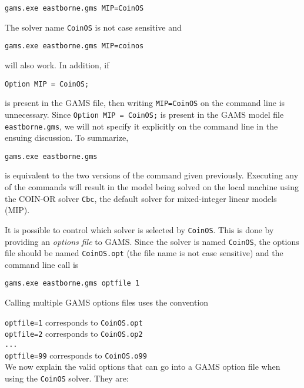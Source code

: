 \begin{verbatim}
gams.exe eastborne.gms MIP=CoinOS
\end{verbatim}
The solver name {\tt CoinOS} is not case sensitive and 
\begin{verbatim}
gams.exe eastborne.gms MIP=coinos
\end{verbatim}
will also work.  In addition, if
\begin{verbatim}
Option MIP = CoinOS;
\end{verbatim}
is present in the GAMS file, then writing {\tt MIP=CoinOS} on the command line is unnecessary.
Since {\tt Option MIP = CoinOS;} is present in the GAMS model file {\tt eastborne.gms}, 
we will not specify it explicitly on the command line in the ensuing discussion. To summarize,
\begin{verbatim}
gams.exe eastborne.gms 
\end{verbatim}
is equivalent to the two versions of the command given previously.  Executing any of the commands will 
result in the model being solved on the local machine using the COIN-OR solver {\tt Cbc}, the default solver 
for 
mixed-integer linear models (MIP).

It is possible to control which solver is selected by {\tt CoinOS}.    This is done by providing an {\it options file}  to  GAMS.   
Since the solver is named {\tt  CoinOS}, the options file should  be named {\tt CoinOS.opt}  (the file name is not case sensitive)
and the command line call is 
\begin{verbatim}
gams.exe eastborne.gms optfile 1
\end{verbatim}
Calling multiple GAMS options files uses the convention

{\tt optfile=1} corresponds to {\tt CoinOS.opt}  \\
{\tt optfile=2} corresponds to {\tt CoinOS.op2}  \\
{\tt ...} \\
{\tt optfile=99} corresponds to {\tt CoinOS.o99} \\

We now explain the valid options that can go into a GAMS option file when using the {\tt CoinOS} solver.  They are:


